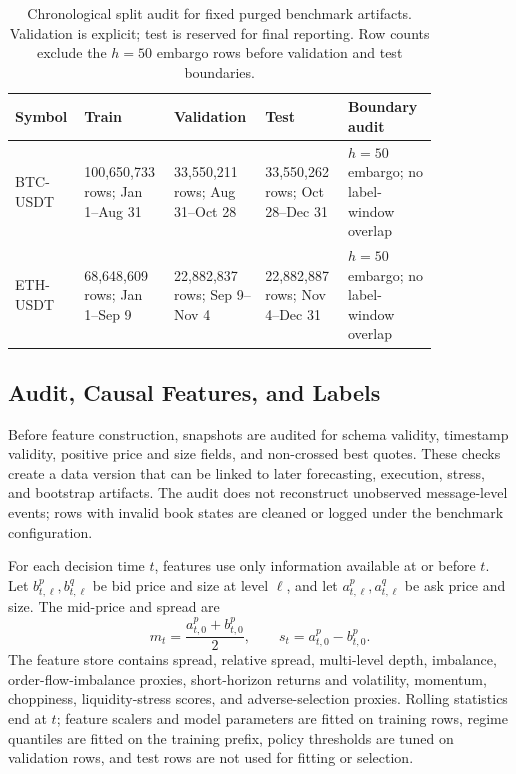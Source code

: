 \documentclass[conference]{IEEEtran}
\begin{document}
\begin{table}[t]
\centering
\caption{Chronological split audit for fixed purged benchmark artifacts. Validation is explicit; test is reserved for final reporting. Row counts exclude the $h=50$ embargo rows before validation and test boundaries.}
\label{tab:data_split}
\scriptsize
\begin{tabular}{@{}p{0.10\linewidth}p{0.18\linewidth}p{0.18\linewidth}p{0.18\linewidth}p{0.20\linewidth}@{}}
\toprule
Symbol & Train & Validation & Test & Boundary audit \\
\midrule
BTC-USDT & 100,650,733 rows; Jan 1--Aug 31 & 33,550,211 rows; Aug 31--Oct 28 & 33,550,262 rows; Oct 28--Dec 31 & $h=50$ embargo; no label-window overlap \\
ETH-USDT & 68,648,609 rows; Jan 1--Sep 9 & 22,882,837 rows; Sep 9--Nov 4 & 22,882,887 rows; Nov 4--Dec 31 & $h=50$ embargo; no label-window overlap \\
\bottomrule
\end{tabular}
\end{table}

\subsection{Audit, Causal Features, and Labels}
Before feature construction, snapshots are audited for schema validity, timestamp validity, positive price and size fields, and non-crossed best quotes. These checks create a data version that can be linked to later forecasting, execution, stress, and bootstrap artifacts. The audit does not reconstruct unobserved message-level events; rows with invalid book states are cleaned or logged under the benchmark configuration.

For each decision time $t$, features use only information available at or before $t$. Let $b^{p}_{t,\ell},b^{q}_{t,\ell}$ be bid price and size at level $\ell$, and let $a^{p}_{t,\ell},a^{q}_{t,\ell}$ be ask price and size. The mid-price and spread are
\begin{equation}
m_t=\frac{a^{p}_{t,0}+b^{p}_{t,0}}{2},\qquad s_t=a^{p}_{t,0}-b^{p}_{t,0}.
\end{equation}
The feature store contains spread, relative spread, multi-level depth, imbalance, order-flow-imbalance proxies, short-horizon returns and volatility, momentum, choppiness, liquidity-stress scores, and adverse-selection proxies. Rolling statistics end at $t$; feature scalers and model parameters are fitted on training rows, regime quantiles are fitted on the training prefix, policy thresholds are tuned on validation rows, and test rows are not used for fitting or selection.
\end{document}
